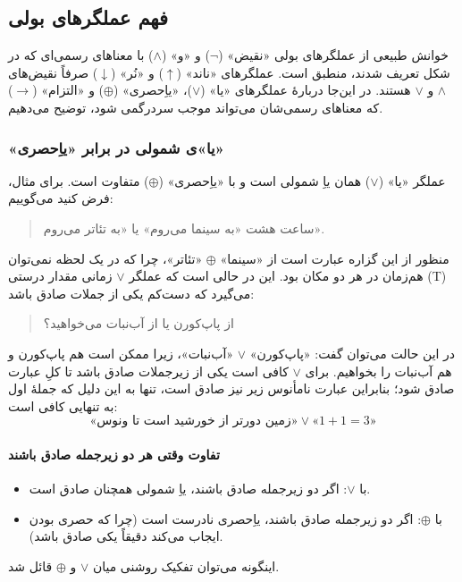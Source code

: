 \subsection*{ فهم عملگرهای بولی}
      خوانش طبیعی از عملگرهای بولی «نقیض» ($\neg$) و «و» ($\land$) با معناهای رسمی‌ای که در شکل  تعریف شدند، منطبق است. عملگرهای «ناند» ($\uparrow$) و «نُر» ($\downarrow$) صرفاً نقیض‌های $\land$ و $\lor$ هستند. در این‌جا دربارهٔ عملگرهای «یا» ($\lor$)، «یاِحصری» ($\oplus$) و «التزام» ($\rightarrow$) که معناهای رسمی‌شان می‌تواند موجب سردرگمی شود، توضیح می‌دهیم.
      \subsubsection*{«یا»ی شمولی در برابر «یاِحصری»}
        عملگر «یا» ($\lor$) همان یاِ شمولی است و با «یاِحصری» ($\oplus$) متفاوت است. برای مثال، فرض کنید می‌گوییم:
        \begin{quote}
        ساعت هشت «به سینما می‌روم» یا «به تئاتر می‌روم».
        \end{quote}
        منظور از این گزاره عبارت است از «سینما» $\oplus$ «تئاتر»، چرا که در یک لحظه نمی‌توان هم‌زمان در هر دو مکان بود. این در حالی است که عملگر $\lor$ زمانی مقدار درستی (T) می‌گیرد که دست‌کم یکی از جملات صادق باشد:
        \begin{quote}
        از پاپ‌کورن یا از آب‌نبات می‌خواهید؟
        \end{quote}
        در این حالت می‌توان گفت: «پاپ‌کورن» $\lor$ «آب‌نبات»، زیرا ممکن است هم پاپ‌کورن و هم آب‌نبات را بخواهیم.  
        برای $\lor$ کافی است یکی از زیرجملات صادق باشد تا کلِ عبارت صادق شود؛ بنابراین عبارت نامأنوس زیر نیز صادق است، تنها به این دلیل که جملهٔ اول به تنهایی کافی است:
        \[
        \text{«زمین دورتر از خورشید است تا ونوس»} \lor \text{«$1+1=3$»}
        \]
      \paragraph{تفاوت وقتی هر دو زیرجمله صادق باشند}
        \begin{itemize}
          \item با $\lor$: اگر دو زیرجمله صادق باشند، یاِ شمولی همچنان صادق است.
          \item با $\oplus$: اگر دو زیرجمله صادق باشند، یاِحصری نادرست است (چرا که حصری بودن ایجاب می‌کند دقیقاً یکی صادق باشد).
        \end{itemize}
        اینگونه می‌توان تفکیک روشنی میان $\lor$ و $\oplus$ قائل شد.

